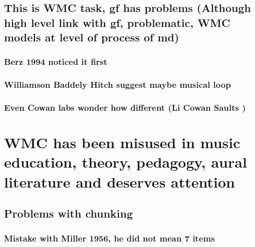 \documentclass[]{book}
\theoremstyle{definition}
\theoremstyle{definition}
\theoremstyle{definition}
\theoremstyle{remark}
\begin{document}
\hypertarget{this-is-wmc-task-gf-has-problems-although-high-level-link-with-gf-problematic-wmc-models-at-level-of-process-of-md}{%
\subsection{This is WMC task, gf has problems (Although high level link
with gf, problematic, WMC models at level of process of
md)}\label{this-is-wmc-task-gf-has-problems-although-high-level-link-with-gf-problematic-wmc-models-at-level-of-process-of-md}}

\hypertarget{berz-1994-noticed-it-first}{%
\subsubsection{Berz 1994 noticed it
first}\label{berz-1994-noticed-it-first}}

\hypertarget{williamson-baddely-hitch-suggest-maybe-musical-loop}{%
\subsubsection{Williamson Baddely Hitch suggest maybe musical
loop}\label{williamson-baddely-hitch-suggest-maybe-musical-loop}}

\hypertarget{even-cowan-labs-wonder-how-different-li-cowan-saults}{%
\subsubsection{Even Cowan labs wonder how different (Li Cowan Saults
)}\label{even-cowan-labs-wonder-how-different-li-cowan-saults}}

\hypertarget{wmc-has-been-misused-in-music-education-theory-pedagogy-aural-literature-and-deserves-attention}{%
\section{WMC has been misused in music education, theory, pedagogy,
aural literature and deserves
attention}\label{wmc-has-been-misused-in-music-education-theory-pedagogy-aural-literature-and-deserves-attention}}

\hypertarget{problems-with-chunking}{%
\subsection{Problems with chunking}\label{problems-with-chunking}}

\hypertarget{mistake-with-miller-1956-he-did-not-mean-7-items}{%
\subsubsection{Mistake with Miller 1956, he did not mean 7
items}\label{mistake-with-miller-1956-he-did-not-mean-7-items}}
\end{document}
